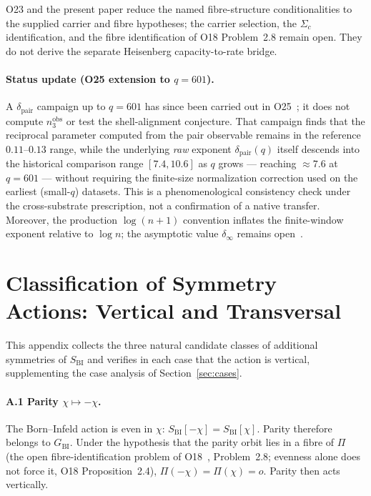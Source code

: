 \documentclass[11pt,a4paper]{article}
\newcommand{\dpair}{\delta_{\mathrm{pair}}}
\newcommand{\GBI}{G_{\mathrm{BI}}}
\newcommand{\SBI}{S_{\mathrm{BI}}}
\begin{document}
  O23 and the present paper reduce the named fibre-structure conditionalities to the
  supplied carrier and fibre hypotheses; the carrier selection, the $\Sigma_c$ identification,
  and the fibre identification of O18 Problem~2.8 remain open.
  They do not derive the separate Heisenberg capacity-to-rate bridge.

  \paragraph{Status update (O25 extension to $q = 601$).}
    A $\dpair$ campaign up to $q = 601$ has since been carried out in O25~\cite{Beau2026a29};
    it does not compute $n_3^{\mathrm{obs}}$ or test the shell-alignment conjecture.
    That campaign finds that the reciprocal parameter
    computed from the pair observable remains in the reference $0.11$--$0.13$ range, while the
    underlying \emph{raw} exponent $\dpair(q)$ itself descends into the historical comparison range
    $[7.4, 10.6]$ as $q$ grows --- reaching $\approx 7.6$ at $q = 601$ --- without requiring the
    finite-size normalization correction used on the earliest (small-$q$) datasets.
    This is a phenomenological consistency check under the cross-substrate prescription, not a
    confirmation of a native transfer.
    Moreover, the production $\log(n+1)$ convention inflates the finite-window exponent relative
    to $\log n$; the asymptotic value $\delta_\infty$ remains open~\cite{Beau2026sgn}.

  \appendix

  \section{Classification of Symmetry Actions: Vertical and Transversal}
  \label{app:examples}

  This appendix collects the three natural candidate classes of additional symmetries of $\SBI$
  and verifies in each case that the action is vertical, supplementing the case analysis of
  Section~\ref{sec:cases}.

  \paragraph{A.1 Parity $\chi \mapsto -\chi$.}
    The Born--Infeld action is even in $\chi$: $\SBI[-\chi] = \SBI[\chi]$.
    Parity therefore belongs to $\GBI$.
    Under the hypothesis that the parity orbit lies in a fibre of $\Pi$ (the open
    fibre-identification problem of O18~\cite{Beau2026a22}, Problem~2.8; evenness alone does
    not force it, O18 Proposition~2.4), $\Pi(-\chi) = \Pi(\chi) = o$.
    Parity then acts vertically.
\end{document}
